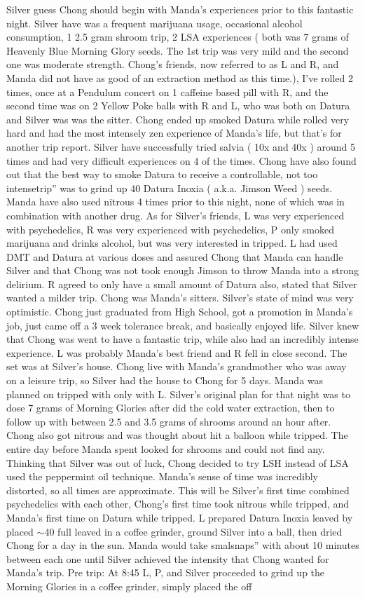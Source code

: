 \documentclass[12pt]{book}
\begin{document}
Silver guess Chong should begin with Manda's experiences prior to this fantastic night. Silver have was a frequent marijuana usage, occasional alcohol consumption, 1 2.5 gram shroom trip, 2 LSA experiences ( both was 7 grams of Heavenly Blue Morning Glory seeds. The 1st trip was very mild and the second one was moderate strength. Chong's friends, now referred to as L and R, and Manda did not have as good of an extraction method as this time.), I've rolled 2 times, once at a Pendulum concert on 1 caffeine based pill with R, and the second time was on 2 Yellow Poke balls with R and L, who was both on Datura and Silver was was the sitter. Chong ended up smoked Datura while rolled very hard and had the most intensely zen experience of Manda's life, but that's for another trip report. Silver have successfully tried salvia ( 10x and 40x ) around 5 times and had very difficult experiences on 4 of the times. Chong have also found out that the best way to smoke Datura to receive a controllable, not too intensetrip'' was to grind up 40 Datura Inoxia ( a.k.a. Jimson Weed ) seeds. Manda have also used nitrous 4 times prior to this night, none of which was in combination with another drug. As for Silver's friends, L was very experienced with psychedelics, R was very experienced with psychedelics, P only smoked marijuana and drinks alcohol, but was very interested in tripped. L had used DMT and Datura at various doses and assured Chong that Manda can handle Silver and that Chong was not took enough Jimson to throw Manda into a strong delirium. R agreed to only have a small amount of Datura also, stated that Silver wanted a milder trip. Chong was Manda's sitters. Silver's state of mind was very optimistic. Chong just graduated from High School, got a promotion in Manda's job, just came off a 3 week tolerance break, and basically enjoyed life. Silver knew that Chong was went to have a fantastic trip, while also had an incredibly intense experience. L was probably Manda's best friend and R fell in close second. The set was at Silver's house. Chong live with Manda's grandmother who was away on a leisure trip, so Silver had the house to Chong for 5 days. Manda was planned on tripped with only with L. Silver's original plan for that night was to dose 7 grams of Morning Glories after did the cold water extraction, then to follow up with between 2.5 and 3.5 grams of shrooms around an hour after. Chong also got nitrous and was thought about hit a balloon while tripped. The entire day before Manda spent looked for shrooms and could not find any. Thinking that Silver was out of luck, Chong decided to try LSH instead of LSA used the peppermint oil technique. Manda's sense of time was incredibly distorted, so all times are approximate. This will be Silver's first time combined psychedelics with each other, Chong's first time took nitrous while tripped, and Manda's first time on Datura while tripped. L prepared Datura Inoxia leaved by placed $\sim$40 full leaved in a coffee grinder, ground Silver into a ball, then dried Chong for a day in the sun. Manda would take smalsnaps'' with about 10 minutes between each one until Silver achieved the intensity that Chong wanted for Manda's trip. Pre trip: At 8:45 L, P, and Silver proceeded to grind up the Morning Glories in a coffee grinder, simply placed the off 
\end{document}
